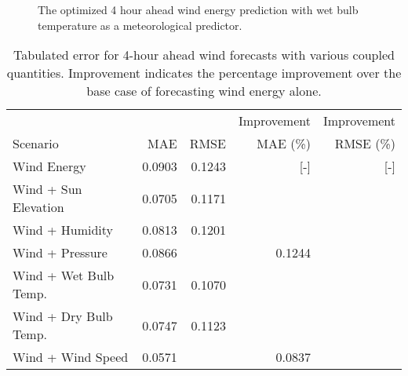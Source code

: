\begin{figure*}[!ht]
  \centering
  
  \caption{The optimized 4 hour ahead wind energy prediction with wet bulb
  temperature as a meteorological predictor.}
  \label{fig:wind04}
\end{figure*}
  \begin{table*}[!ht]
    \centering
    \caption{Tabulated error for 4-hour ahead wind forecasts with various coupled quantities. Improvement indicates the percentage improvement over the base case of forecasting wind energy alone.}
    \label{tab:wind04}
    \begin{tabular}{l|r|r|r|r}
      &  & & Improvement & Improvement \\
      Scenario  & MAE & RMSE & MAE (\%) & RMSE (\%)\\
      \hline
      Wind Energy & 0.0903 & 0.1243 & [-] & [-] \\
      Wind + Sun Elevation & 0.0705 & 0.1171 & & \\
      Wind + Humidity & 0.0813 & 0.1201 & & \\
      Wind + Pressure & 0.0866 & & 0.1244 & \\
      Wind + Wet Bulb Temp. & 0.0731 & 0.1070 & & \\
      Wind + Dry Bulb Temp. & 0.0747 & 0.1123 &  & \\
      Wind + Wind Speed & 0.0571 & &  0.0837 & \\
    \end{tabular}
  \end{table*}
